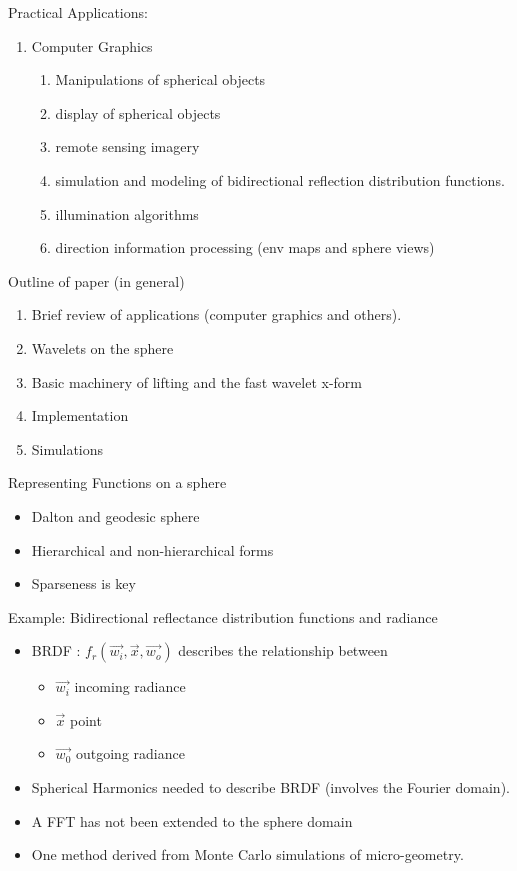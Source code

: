 \documentclass[11pt]{article}
\begin{document}
Practical Applications:
\begin{enumerate}
\item Computer Graphics
\begin{enumerate}
\item Manipulations of spherical objects
\item display of spherical objects
\item remote sensing imagery
\item simulation and modeling of bidirectional reflection distribution functions.
\item illumination algorithms
\item direction information processing (env maps and sphere views)
\end{enumerate}

\end{enumerate}

Outline of paper (in general) 
\begin{enumerate}
\item Brief review of applications (computer graphics and others).
\item Wavelets on the sphere 
\item Basic machinery of lifting and the fast wavelet x-form
\item Implementation
\item Simulations 
\end{enumerate}

Representing Functions on a sphere 
\begin{itemize}
\item Dalton and geodesic sphere
\item Hierarchical and non-hierarchical forms
\item Sparseness is key
\end{itemize}

Example: Bidirectional reflectance distribution functions and radiance
\begin{itemize}
\item BRDF : $f_r (\vec{w_i} , \vec{x}, \vec{w_o})$ describes the relationship between 
\begin{itemize}
\item $\vec{w_i}$ incoming radiance
\item $\vec{x}$ point 
\item $\vec{w_0}$ outgoing radiance
\end{itemize}

\item Spherical Harmonics needed to describe BRDF (involves the Fourier domain).
\item A FFT has not been extended to the sphere domain
\item One method derived from Monte Carlo simulations of micro-geometry.
\end{itemize}
\end{document}
